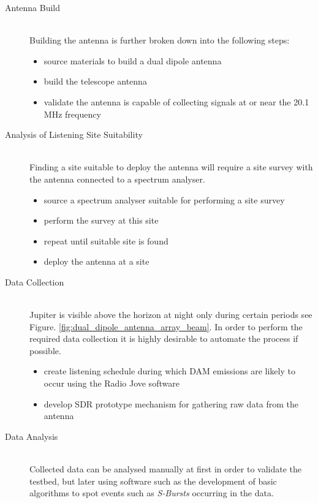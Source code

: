 \documentclass[runningheads,a4paper]{llncs}
\begin{document}
\begin{description}
  \item[Antenna Build] \hfill \\
    Building the antenna is further broken down into the following steps:
    \begin{itemize}
      \item source materials to build a dual dipole antenna
      \item build the telescope antenna
      \item validate the antenna is capable of collecting signals at or near the 20.1 MHz frequency \\
    \end{itemize}
  \item [Analysis of Listening Site Suitability] \hfill \\
    Finding a site suitable to deploy the antenna will require a site survey with the antenna connected to a spectrum analyser.
    \begin{itemize}
      \item source a spectrum analyser suitable for performing a site survey
      \item perform the survey at this site
      \item repeat until suitable site is found 
      \item deploy the antenna at a site \\
    \end{itemize}
  \item [Data Collection] \hfill \\
    Jupiter is visible above the horizon at night only during certain periods see Figure. \ref{fig:dual_dipole_antenna_array_beam}. In order to perform the required data collection it is highly desirable to automate the process if possible.
    \begin{itemize}
      \item create listening schedule during which \gls{DAM} emissions are likely to occur using the Radio Jove software
      \item develop \gls{SDR} prototype mechanism for gathering raw data from the antenna\\
    \end{itemize}
  \item [Data Analysis] \hfill \\
    Collected data can be analysed manually at first in order to validate the testbed, but later using software such as the development of basic algorithms to spot events such as \textit{S-Bursts} occurring in the data.

\end{description}
\end{document}
